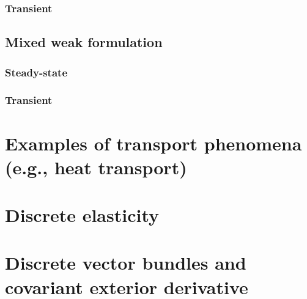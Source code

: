 \documentclass[fleqn]{article}
\theoremstyle{definition}
\begin{document}
\subsubsection{Transient}



\subsection{Mixed weak formulation}
\subsubsection{Steady-state}


\subsubsection{Transient}




\section{Examples of transport phenomena (e.g., heat transport)}
\label{section:examples_of_transport_phenomena}







\section{Discrete elasticity}
\label{section:discrete_elasticity}



\section{Discrete vector bundles and covariant exterior derivative}
\label{section:discrete_vector_bundles_and_covariant_exterior_derivative}








\end{document}
